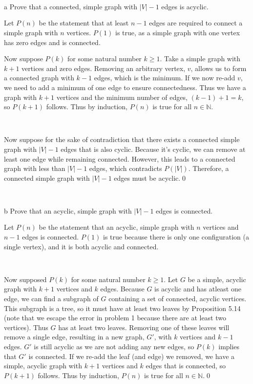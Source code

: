 \documentclass{article}
\begin{document}
\
\hline
\section{}

\begin{problem} a
Prove that a connected, simple graph with $|V| - 1$ edges is acyclic.
\end{problem}

Let $P( n)$ be the statement that at least $n-1$ edges are required to connect a simple graph with $n$ vertices. $P( 1)$ is true, as a simple graph with one vertex has zero edges and is connected.

Now suppose $P( k)$ for some natural number $k\geq 1$. Take a simple graph with $k+1$ vertices and zero edges. Removing an arbitrary vertex, $v$, allows us to form a connected graph with $k-1$ edges, which is the minimum. If we now re-add $v$, we need to add a minimum of one edge to ensure connectedness. Thus we have a graph with $k+1$ vertices and the minimum number of edges, $( k-1) +1=k$, so $P( k+1)$ follows. Thus by induction, $P( n)$ is true for all $n\in \mathbb{N}$.

\

Now suppose for the sake of contradiction that there exists a connected simple graph with $|V|-1$ edges that is also cyclic. Because it's cyclic, we can remove at least one edge while remaining connected. However, this leads to a connected graph with less than $|V|-1$ edges, which contradicts $P( |V|)$. Therefore, a connected simple graph with $|V|-1$ edges must be acyclic.\qed

\

\begin{problem} b
Prove that an acyclic, simple graph with $|V| - 1$ edges is connected.
\end{problem}

Let $P( n)$ be the statement that an acyclic, simple graph with $n$ vertices and $n-1$ edges is connected. $P( 1)$ is true because there is only one configuration (a single vertex), and it is both acyclic and connected.

\

Now supposed $P( k)$ for some natural number $k\geq 1$. Let $G$ be a simple, acyclic graph with $k+1$ vertices and $k$ edges. Because $G$ is acyclic and has atleast one edge, we can find a subgraph of $G$ containing a set of connected, acyclic vertices. This subgraph is a tree, so it must have at least two leaves by Proposition 5.14 (note that we escape the error in problem 1 because there are at least two vertices). Thus $G$ has at least two leaves. Removing one of these leaves will remove a single edge, resulting in a new graph, $G'$, with $k$ vertices and $k-1$ edges. $G'$ is still acyclic as we are not adding any new edges, so $P( k)$ implies that $G'$ is connected. If we re-add the leaf (and edge) we removed, we have a simple, acyclic graph with $k+1$ vertices and $k$ edges that is connected, so $P( k+1)$ follows. Thus by induction, $P( n)$ is true for all $n\in \mathbb{N}$.\qed
\end{document}
